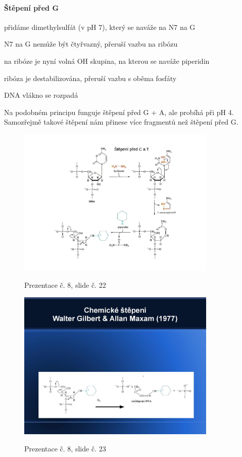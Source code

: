 \documentclass[DIV=8]{scrreprt}
\begin{document}
\paragraph{Štěpení před G}
\begin{myEnumerate}[nosep]
    \item přidáme dimethylsulfát (v pH 7), který se naváže na N7 na G
    \item N7 na G nemůže být čtyřvazný, přeruší vazbu na ribózu
    \item na ribóze je nyní volná OH skupina, na kterou se naváže piperidin
    \item ribóza je destabilizována, přeruší vazbu s oběma fosfáty
    \item DNA vlákno se rozpadá
\end{myEnumerate}



Na podobném principu funguje štěpení před G + A, ale probíhá při pH 4. Samozřejmě takové štěpení nám přinese více fragmentů než štěpení před G.

\begin{figure}
    \caption{Prezentace č. 8, slide č. 22}
    \includegraphics[width=0.85\textwidth]{slides-8/slide-22.jpg}
    \centering
    \label{slides-8-slide-22}
\end{figure}
\begin{figure}
    \caption{Prezentace č. 8, slide č. 23}
    \includegraphics[width=0.85\textwidth]{slides-8/slide-23.jpg}
    \centering
    \label{slides-8-slide-23}
\end{figure}
\end{document}
